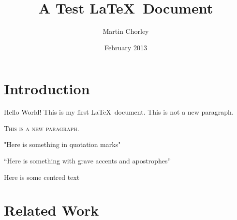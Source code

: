 \documentclass[12pt,twoside,a4paper]{article}
\title{A Test \LaTeX\ Document}
\author{Martin Chorley}
\date{February 2013}
\begin{document}
\maketitle

\begin{abstract}
\lipsum[2]
\end{abstract}

\section*{Introduction}
{\Huge Hello World!} This is       my       first       \LaTeX\     document.
This is not a new paragraph.

\textsc{This is a new paragraph.}

"Here is something in quotation marks"

``Here is something with grave accents and apostrophes''

\begin{center}{\tiny Here is some centred text}\end{center}


\lipsum[1-4]

\section{Related Work}

\lipsum[5-6]
\end{document}
